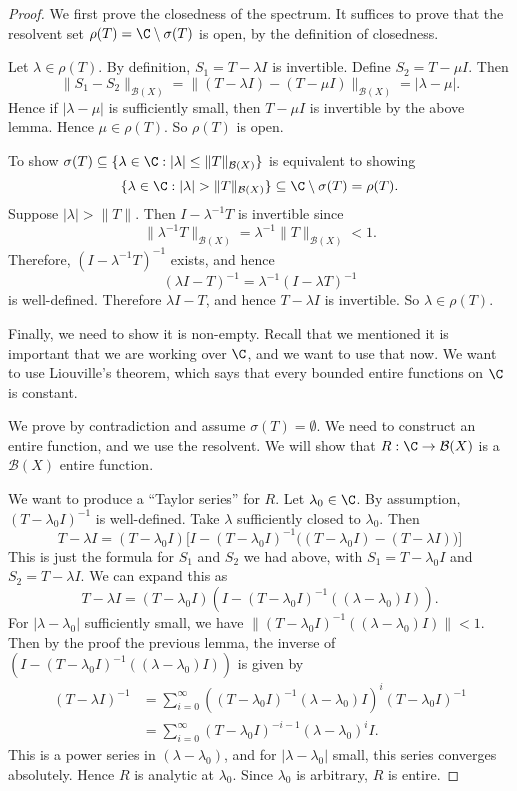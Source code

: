 \documentclass[a4paper]{article}
\begin{document}
\begin{proof}
  We first prove the closedness of the spectrum. It suffices to prove that the resolvent set $\rho(T) = \C \setminus \sigma(T)$ is open, by the definition of closedness.

  Let $\lambda \in \rho(T)$. By definition, $S_1 = T - \lambda I$ is invertible. Define $S_2 = T - \mu I$. Then
  \[
    \|S_1 - S_2\|_{\mathcal{B}(X)} = \|(T - \lambda I) - (T - \mu I)\|_{\mathcal{B}(X)} = |\lambda - \mu|.
  \]
  Hence if $|\lambda - \mu|$ is sufficiently small, then $T - \mu I$ is invertible by the above lemma. Hence $\mu \in \rho(T)$. So $\rho(T)$ is open.

  To show $\sigma(T) \subseteq \{\lambda \in \C: |\lambda| \leq \|T\|_{\mathcal{B}(X)}\}$ is equivalent to showing
  \[
    \{\lambda \in \C: |\lambda| > \|T\|_{\mathcal{B}(X)}\} \subseteq \C \setminus \sigma(T) = \rho(T).
  \]
  Suppose $|\lambda| > \|T\|$. Then $I - \lambda^{-1} T$ is invertible since
  \[
    \|\lambda^{-1} T\|_{\mathcal{B}(X)} = \lambda^{-1} \|T\|_{\mathcal{B}(X)} < 1.
  \]
  Therefore, $(I - \lambda^{-1} T)^{-1}$ exists, and hence
  \[
    (\lambda I - T)^{-1} = \lambda^{-1} (I - \lambda T)^{-1}
  \]
  is well-defined. Therefore $\lambda I - T$, and hence $T - \lambda I$ is invertible. So $\lambda \in \rho(T)$.

  Finally, we need to show it is non-empty. Recall that we mentioned it is important that we are working over $\C$, and we want to use that now. We want to use Liouville's theorem, which says that every bounded entire functions on $\C$ is constant.

  We prove by contradiction and assume $\sigma(T) = \emptyset$. We need to construct an entire function, and we use the resolvent. We will show that $R: \C \to \mathcal{B}(X)$ is a $\mathcal{B}(X)$ entire function.

  We want to produce a ``Taylor series'' for $R$. Let $\lambda_0 \in \C$. By assumption, $(T - \lambda_0 I)^{-1}$ is well-defined. Take $\lambda$ sufficiently closed to $\lambda_0$. Then
  \[
    T - \lambda I = (T - \lambda_0 I)\Big[I - (T - \lambda_0 I)^{-1} \Big((T - \lambda_0 I) - (T - \lambda I)\Big)\Big]
  \]
  This is just the formula for $S_1$ and $S_2$ we had above, with $S_1 = T - \lambda_0 I$ and $S_2 = T - \lambda I$. We can expand this as
  \[
    T - \lambda I = (T - \lambda_0 I)(I - (T - \lambda_0 I)^{-1}((\lambda - \lambda_0)I)).
  \]
  For $|\lambda - \lambda_0|$ sufficiently small, we have $\|(T - \lambda_0 I)^{-1}((\lambda - \lambda_0)I)\| < 1$. Then by the proof the previous lemma, the inverse of $(I - (T - \lambda_0 I)^{-1}((\lambda - \lambda_0)I))$ is given by
  \begin{align*}
    (T - \lambda I)^{-1} &= \sum_{i = 0}^\infty ((T - \lambda_0 I)^{-1} (\lambda - \lambda_0) I)^i (T - \lambda_0 I)^{-1}\\
    &= \sum_{i = 0}^\infty (T - \lambda_0 I)^{-i - 1}(\lambda - \lambda_0)^i I.
  \end{align*}
  This is a power series in $(\lambda - \lambda_0)$, and for $|\lambda - \lambda_0|$ small, this series converges absolutely. Hence $R$ is analytic at $\lambda_0$. Since $\lambda_0$ is arbitrary, $R$ is entire.


\end{proof}
\end{document}
